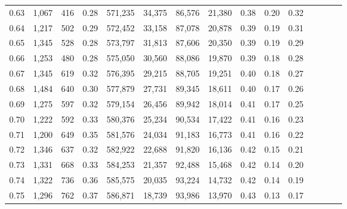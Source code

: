\begin{tabular}{rrrcrrrrrrrrrrr}
0.63 &   1,067 &    416 &                                       0.28 &  571,235 &   34,375 &   86,576 &   21,380 &  0.38 &  0.20 &                         0.32 \\
0.64 &   1,217 &    502 &                                       0.29 &  572,452 &   33,158 &   87,078 &   20,878 &  0.39 &  0.19 &                         0.31 \\
0.65 &   1,345 &    528 &                                       0.28 &  573,797 &   31,813 &   87,606 &   20,350 &  0.39 &  0.19 &                         0.29 \\
0.66 &   1,253 &    480 &                                       0.28 &  575,050 &   30,560 &   88,086 &   19,870 &  0.39 &  0.18 &                         0.28 \\
0.67 &   1,345 &    619 &                                       0.32 &  576,395 &   29,215 &   88,705 &   19,251 &  0.40 &  0.18 &                         0.27 \\
0.68 &   1,484 &    640 &                                       0.30 &  577,879 &   27,731 &   89,345 &   18,611 &  0.40 &  0.17 &                         0.26 \\
0.69 &   1,275 &    597 &                                       0.32 &  579,154 &   26,456 &   89,942 &   18,014 &  0.41 &  0.17 &                         0.25 \\
0.70 &   1,222 &    592 &                                       0.33 &  580,376 &   25,234 &   90,534 &   17,422 &  0.41 &  0.16 &                         0.23 \\
0.71 &   1,200 &    649 &                                       0.35 &  581,576 &   24,034 &   91,183 &   16,773 &  0.41 &  0.16 &                         0.22 \\
0.72 &   1,346 &    637 &                                       0.32 &  582,922 &   22,688 &   91,820 &   16,136 &  0.42 &  0.15 &                         0.21 \\
0.73 &   1,331 &    668 &                                       0.33 &  584,253 &   21,357 &   92,488 &   15,468 &  0.42 &  0.14 &                         0.20 \\
0.74 &   1,322 &    736 &                                       0.36 &  585,575 &   20,035 &   93,224 &   14,732 &  0.42 &  0.14 &                         0.19 \\
0.75 &   1,296 &    762 &                                       0.37 &  586,871 &   18,739 &   93,986 &   13,970 &  0.43 &  0.13 &                         0.17 \\

\end{tabular}

